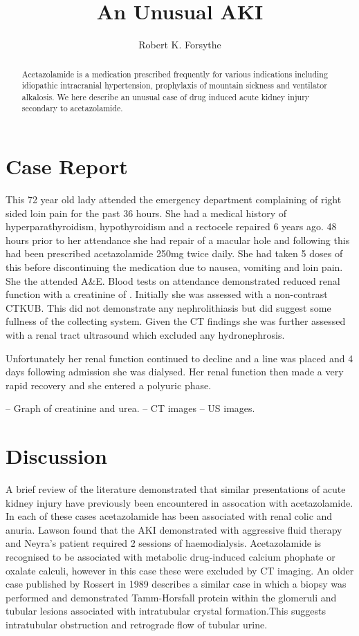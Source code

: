 \documentclass[11pt, ]{article}
\title{An Unusual AKI}
\author{Robert K. Forsythe}
\begin{document}
\maketitle
\begin{abstract}
	Acetazolamide is a medication prescribed frequently for various indications including idiopathic intracranial hypertension, prophylaxis of mountain sickness and ventilator alkalosis. We here describe an unusual case of drug induced acute kidney injury secondary to acetazolamide. 
\end{abstract}
		
\section*{Case Report}

This 72 year old lady attended the emergency department complaining of right sided loin pain for the past 36 hours. She had a medical history of hyperparathyroidism, hypothyroidism and a rectocele repaired 6 years ago. 48 hours prior to her attendance she had repair of a macular hole and following this had been prescribed acetazolamide 250mg twice daily. She had taken 5 doses of this before discontinuing the medication due to nausea, vomiting and loin pain. She the attended A\&E. Blood tests on attendance demonstrated reduced renal function with a creatinine of \todo. Initially she was assessed with a non-contrast CTKUB. This did not demonstrate any nephrolithiasis but did suggest some fullness of the collecting system. Given the CT findings she was further assessed with a renal tract ultrasound which excluded any hydronephrosis. 

Unfortunately her renal function continued to decline and a line was placed and 4 days following admission she was dialysed. Her renal function then made a very rapid recovery and she entered a polyuric phase. 


-- Graph of creatinine and urea.
-- CT images
-- US images. 


\section*{Discussion}
A brief review of the literature demonstrated that similar presentations of acute kidney injury have previously been encountered in assocation with acetazolamide\cite{Neyra2014, Rossert1984, Lawson2020}. In each of these cases acetazolamide has been associated with renal colic and anuria. Lawson found that the AKI demonstrated with aggressive fluid therapy and Neyra's patient required 2 sessions of haemodialysis. Acetazolamide is recognised to be associated with metabolic drug-induced calcium phophate or oxalate calculi, however in this case these were excluded by CT imaging. An older case published by Rossert in 1989 describes a similar case in which a biopsy was performed and demonstrated Tamm-Horsfall protein within the glomeruli and tubular lesions associated with intratubular crystal formation.This suggests intratubular obstruction and retrograde flow of tubular urine\cite{Rossert1984}.  


\printbibliography
\end{document}
